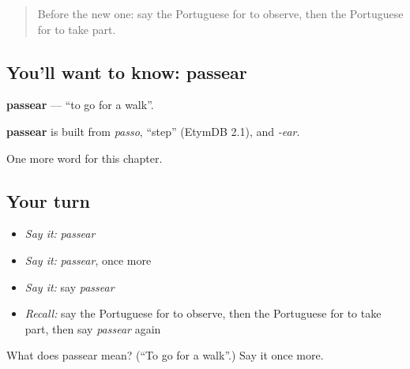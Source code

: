 \label{lesson:PT-C205-passear}



\begin{quote}
Before the new one: say the Portuguese for to observe, then the Portuguese for to take part.
\end{quote}

\subsection*{You'll want to know: passear}
\textbf{passear} — \textquotedblleft{}to go for a walk\textquotedblright{}.

\begin{cousinweb}
\textbf{passear} is built from \emph{passo}, \textquotedblleft{}step\textquotedblright{} (EtymDB 2.1), and \emph{-ear}.
\end{cousinweb}

\begin{grammarlens}[title={What you've built}]
One more word for this chapter.
\end{grammarlens}

\subsection*{Your turn}
\begin{itemize}
\raggedright
  \item \emph{Say it:} \emph{passear}
  \item \emph{Say it:} \emph{passear}, once more
  \item \emph{Say it:} say \emph{passear}
  \item \emph{Recall:} say the Portuguese for to observe, then the Portuguese for to take part, then say \emph{passear} again
\end{itemize}

\begin{tcolorbox}[breakable,colback=teal!4,colframe=teal!35!black,title={Before you move on}]
What does passear mean? (\textquotedblleft{}To go for a walk\textquotedblright{}.) Say it once more.
\end{tcolorbox}
